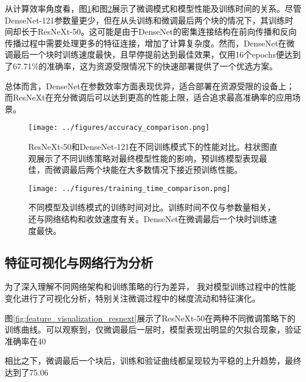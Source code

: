 \documentclass[a4paper,10pt,twocolumn]{article}
\makeatletter
\let\@oldlabel\label
\renewcommand{\label}[1]{\@oldlabel{#1}}
\makeatother
\begin{document}
从计算效率角度看，图\ref{fig:data_scaling}和图\ref{fig:training_time}展示了微调模式和模型性能及训练时间的关系。尽管DenseNet-121参数量更少，但在从头训练和微调最后两个块的情况下，其训练时间却长于ResNeXt-50。这可能是由于DenseNet的密集连接结构在前向传播和反向传播过程中需要处理更多的特征连接，增加了计算复杂度。然而，DenseNet在微调最后一个块时训练速度最快，且早停提前达到最佳效果，仅用16个epochs便达到了67.71\%的准确率，这为资源受限情况下的快速部署提供了一个优选方案。

总体而言，DenseNet在参数效率方面表现优异，适合部署在资源受限的设备上；而ResNeXt在充分微调后可以达到更高的性能上限，适合追求最高准确率的应用场景。

\begin{figure}[H]
\centering
\texttt{[image: ../figures/accuracy\_comparison.png]}
\caption{ResNeXt-50和DenseNet-121在不同训练模式下的性能对比。柱状图直观展示了不同训练策略对最终模型性能的影响，预训练模型表现最佳，而微调最后两个块能在大多数情况下接近预训练性能。}
\label{fig:data_scaling}
\end{figure}

\begin{figure}[H]
\centering
\texttt{[image: ../figures/training\_time\_comparison.png]}
\caption{不同模型及训练模式的训练时间对比。训练时间不仅与参数量相关，还与网络结构和收敛速度有关。DenseNet在微调最后一个块时训练速度最快。}
\label{fig:training_time}
\end{figure}

\subsection{特征可视化与网络行为分析}

为了深入理解不同网络架构和训练策略的行为差异， 我对模型训练过程中的性能变化进行了可视化分析，特别关注微调过程中的梯度流动和特征演化。

图\ref{fig:feature_visualization_resnext}展示了ResNeXt-50在两种不同微调策略下的训练曲线。可以观察到，仅微调最后一层时，模型表现出明显的欠拟合现象，验证准确率在40%

相比之下，微调最后一个块后，训练和验证曲线都呈现较为平稳的上升趋势，最终达到了75.06%
\end{document}
